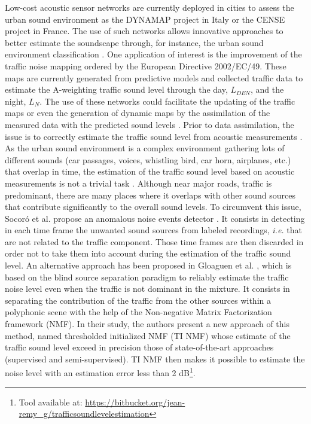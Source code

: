 \documentclass[12pt,english,twoside]{article}
\begin{document}
Low-cost acoustic sensor networks are currently deployed in cities to assess the urban sound environment as the DYNAMAP project \cite{dynamap_2016} in Italy or the CENSE project \cite{picaut2017characterization} in France. The use of such networks allows innovative approaches to better estimate the soundscape through, for instance, the urban sound environment classification \cite{maijala2018environmental}. One application of interest is the improvement of the traffic noise mapping ordered by the European Directive 2002/EC/49. These maps are currently generated from predictive models and collected traffic data to estimate the A-weighting traffic sound level through the day, $L_{DEN}$, and the night, $L_N$. The use of these networks could facilitate the updating of the traffic maps or even the generation of dynamic maps by the assimilation of the measured data with the predicted sound levels \cite{ventura2018assimilation}.
Prior to data assimilation, the issue is to correctly estimate the traffic sound level from acoustic measurements \cite{leiba2017large,socoro2017anomalous}. As the urban sound environment is a complex environment gathering lots of different sounds (car passages, voices, whistling bird, car horn, airplanes, etc.) that overlap in time, the estimation of the traffic sound level  based on acoustic measurements is not a trivial task \cite{mesaros_sound_2015}. Although near major roads, traffic is predominant, there are many places where it overlaps with other sound sources that contribute significantly to the overall sound levels. To circumvent this issue, Socor\'o et al. propose an anomalous noise events detector \cite{socoro2017anomalous}. It consists in detecting in each time frame the unwanted sound sources from labeled recordings, \textit{i.e.} that are not related to the traffic component. Those time frames are then discarded in order not to take them into account during the estimation of the traffic sound level.
An alternative approach has been proposed in Gloaguen et al. \cite{gloaguen2019road}, which is based on the blind source separation paradigm to reliably estimate the traffic noise level even when the traffic is not dominant in the mixture.
It consists in separating the contribution of the traffic from the other sources within a polyphonic scene with the help of the Non-negative Matrix Factorization framework (NMF).
In their study, the authors present a new approach of this method, named thresholded initialized NMF (TI NMF) whose estimate of the traffic sound level exceed in precision those of state-of-the-art approaches (supervised and semi-supervised). TI NMF then makes it possible to estimate the noise level with an estimation error less than 2 dB\footnote{Tool available at: \url{https://bitbucket.org/jean-remy_g/trafficsoundlevelestimation}}.
\end{document}

